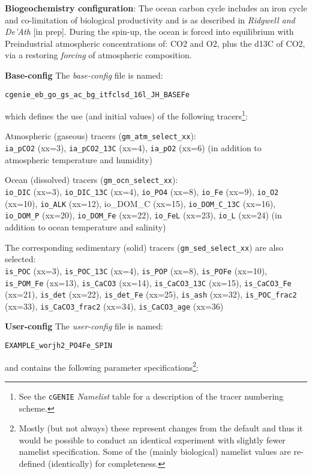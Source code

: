 \documentclass[10pt,twoside]{article}
\begin{document}
\noindent \textbf{Biogeochemistry configuration}: The ocean carbon cycle includes an iron cycle and co-limitation of biological productivity and is as described in \textit{Ridgwell and De'Ath} [in prep]. During the spin-up, the ocean is forced into equilibrium with Preindustrial atmospheric concentrations of: CO2 and O2, plus the d13C of CO2, via a restoring \textit{forcing} of atmospheric composition.

\noindent \textbf{Base-config} The \textit{base-config} file is named:
\vspace{-10pt}\begin{verbatim}cgenie_eb_go_gs_ac_bg_itfclsd_16l_JH_BASEFe\end{verbatim}\vspace{-10pt} which defines the use (and initial values) of the following tracers\footnote{See the \texttt{cGENIE} \textit{Namelist} table for a description of the tracer numbering scheme.}:

\begin{compactenum}
	\item Atmospheric (gaseous) tracers (\texttt{gm\_atm\_select\_xx}):
	\\\texttt{ia\_pCO2} (xx=3), \texttt{ia\_pCO2\_13C} (xx=4), \texttt{ia\_pO2} (xx=6)
		(in addition to atmospheric temperature and humidity)
	\item Ocean (dissolved) tracers (\texttt{gm\_ocn\_select\_xx}):
	\\\texttt{io\_DIC} (xx=3), \texttt{io\_DIC\_13C} (xx=4), \texttt{io\_PO4} (xx=8), \texttt{io\_Fe} (xx=9), \texttt{io\_O2} (xx=10), \texttt{io\_ALK} (xx=12), io\_DOM\_C (xx=15), \texttt{io\_DOM\_C\_13C} (xx=16), \texttt{io\_DOM\_P} (xx=20), \texttt{io\_DOM\_Fe} (xx=22), \texttt{io\_FeL} (xx=23), \texttt{io\_L} (xx=24)
		(in addition to ocean temperature and salinity)
	\item The corresponding sedimentary (solid) tracers (\texttt{gm\_sed\_select\_xx}) are also selected:
	\\\texttt{is\_POC} (xx=3), \texttt{is\_POC\_13C} (xx=4), \texttt{is\_POP} (xx=8), \texttt{is\_POFe} (xx=10), \texttt{is\_POM\_Fe} (xx=13), \texttt{is\_CaCO3} (xx=14), \texttt{is\_CaCO3\_13C} (xx=15), \texttt{is\_CaCO3\_Fe} (xx=21), \texttt{is\_det} (xx=22), \texttt{is\_det\_Fe} (xx=25), \texttt{is\_ash} (xx=32), \texttt{is\_POC\_frac2} (xx=33), \texttt{is\_CaCO3\_frac2} (xx=34), \texttt{is\_CaCO3\_age} (xx=36)
\end{compactenum}


\noindent \textbf{User-config} The \textit{user-config} file is named:
\vspace{-10pt}\begin{verbatim}EXAMPLE_worjh2_PO4Fe_SPIN\end{verbatim}\vspace{-10pt} and contains the following parameter specifications\footnote{Mostly (but not always) these represent changes from the default and thus it would be possible to conduct an identical experiment with slightly fewer namelist specification. Some of the (mainly biological) namelist values are re-defined (identically) for completeness.}:
\end{document}
